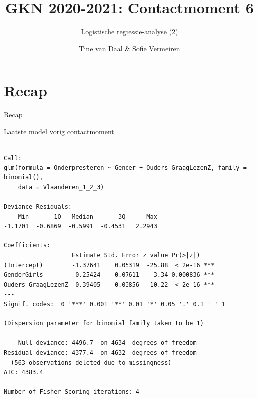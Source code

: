 \documentclass[
  10pt,
  ignorenonframetext,
]{beamer}
\institute{Opleidings- en onderwijswetenschappen}
\title{GKN 2020-2021: Contactmoment 6}
\subtitle{Logistische regressie-analyse (2)}
\author{Tine van Daal \& Sofie Vermeiren}
\date{}
\begin{document}
\frame{\titlepage}

\begin{frame}
  \tableofcontents[hideallsubsections]
\end{frame}
\hypertarget{recap}{%
\section{Recap}\label{recap}}

\begin{frame}{}
\protect\hypertarget{section}{}

\textcolor{uarood}{Recap}

\end{frame}

\begin{frame}[fragile]{Laatste model vorig contactmoment}
\protect\hypertarget{laatste-model-vorig-contactmoment}{}

\tiny

\begin{verbatim}

Call:
glm(formula = Onderpresteren ~ Gender + Ouders_GraagLezenZ, family = binomial(), 
    data = Vlaanderen_1_2_3)

Deviance Residuals: 
    Min       1Q   Median       3Q      Max  
-1.1701  -0.6869  -0.5991  -0.4531   2.2943  

Coefficients:
                   Estimate Std. Error z value Pr(>|z|)    
(Intercept)        -1.37641    0.05319  -25.88  < 2e-16 ***
GenderGirls        -0.25424    0.07611   -3.34 0.000836 ***
Ouders_GraagLezenZ -0.39405    0.03856  -10.22  < 2e-16 ***
---
Signif. codes:  0 '***' 0.001 '**' 0.01 '*' 0.05 '.' 0.1 ' ' 1

(Dispersion parameter for binomial family taken to be 1)

    Null deviance: 4496.7  on 4634  degrees of freedom
Residual deviance: 4377.4  on 4632  degrees of freedom
  (563 observations deleted due to missingness)
AIC: 4383.4

Number of Fisher Scoring iterations: 4
\end{verbatim}

\normalsize

\end{frame}
\end{document}
